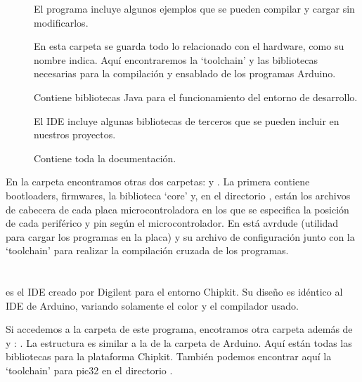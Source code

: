 \begin{description}
	\item[] El programa incluye algunos ejemplos que se pueden compilar y cargar sin modificarlos.
	\item[] En esta carpeta se guarda todo lo relacionado con el hardware, como su nombre indica. Aquí encontraremos la `toolchain' y las bibliotecas necesarias para la compilación y ensablado de los programas Arduino.
	\item[] Contiene bibliotecas Java para el funcionamiento del entorno de desarrollo.
		\item[] El IDE incluye algunas bibliotecas de terceros que se pueden incluir en nuestros proyectos.
		\item[] Contiene toda la documentación.
\end{description}

En la carpeta  encontramos otras dos carpetas:  y .  La primera contiene bootloaders, firmwares, la biblioteca `core' y, en el directorio , están los archivos de cabecera de cada placa microcontroladora en los que se especifica la posición de cada periférico y pin según el microcontrolador.  En  está avrdude (utilidad para cargar los programas en la placa) y su archivo de configuración junto con la `toolchain'  para realizar la compilación cruzada de los programas.

\section{}
\cite{website:mpide} es el IDE creado por Digilent para el entorno Chipkit. Su diseño es idéntico al IDE de Arduino, variando solamente el color y el compilador usado.


Si accedemos a la carpeta  de este programa, encotramos otra carpeta además de  y : . La estructura es similar  a la de la carpeta de Arduino. Aquí están todas las bibliotecas para la plataforma Chipkit. También podemos encontrar aquí la `toolchain'  para pic32 en el directorio .

